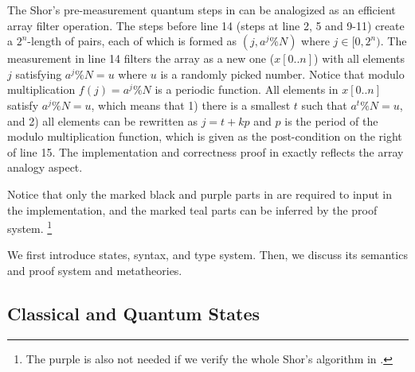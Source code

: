 The Shor's pre-measurement quantum steps in  can be analogized as an efficient array filter operation.
The steps before line 14 (steps at line 2, 5 and 9-11) create a $2^n$-length of pairs, each of which is formed as $(j,a^j \% N)$ where $j\in [0,2^n)$. The measurement in line 14 filters the array as a new one ($x[0..n]$) with all elements $j$ satisfying $a^j \% N=u$ where $u$ is a randomly picked number. Notice that modulo multiplication $f(j)=a^j\%N$ is a periodic function. All elements in $x[0..n]$ satisfy $a^j \% N=u$, which means that 1) there is a smallest $t$ such that $a^t \% N=u$, and 2) all elements can be rewritten as $j=t+kp$ and $p$ is the period of the modulo multiplication function, which is given as the post-condition on the right of line 15.
The implementation and correctness proof in  exactly reflects the array analogy aspect.
Notice that only the marked black and purple parts in  are required to input in the \qafny implementation, and the marked teal parts can be inferred by the \qafny proof system. \footnote{The purple is also not needed if we verify the whole Shor's algorithm in .}

We first introduce \qafny states, syntax, and type system. Then, we discuss its semantics and proof system and metatheories.

\subsection {Classical and Quantum States}

